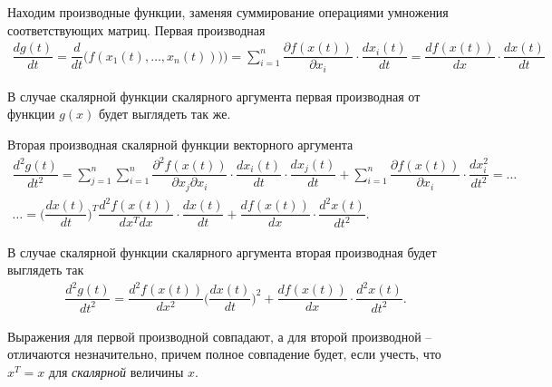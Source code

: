 \documentclass[%
	11pt,
	a4paper,
	utf8,
		]{article}
\begin{document}
Находим производные функции, заменяя суммирование операциями умножения соответствующих матриц. Первая производная
\begin{align*}
	\dfrac{ d g(t) }{ dt } = \dfrac{d}{dt} \Big( f(x_1(t), \ldots, x_n(t))) \Big) = \sum_{i=1}^{n} \dfrac{\partial f(x(t))}{\partial x_i} \cdot \dfrac{ d x_i(t) }{dt} = \dfrac{df(x(t))}{dx} \cdot \dfrac{dx(t)}{dt}
\end{align*}

В случае скалярной функции скалярного аргумента первая производная от функции $ g(x) $ будет выглядеть так же.

Вторая производная скалярной функции векторного аргумента
\begin{multline*}
  \dfrac{d^2 g(t)}{dt^2} = \sum_{j=1}^{n} \sum_{i=1}^{n} \dfrac{ \partial^2 f(x(t)) }{ \partial x_j \partial x_i } \cdot \dfrac{ d x_i(t) }{ dt } \cdot \dfrac{ d x_j(t) }{dt} + \sum_{i=1}^n \dfrac{ \partial f(x(t)) }{\partial x_i} \cdot \dfrac{d x_i^2}{d t^2} = \ldots \\
  \ldots = \Big( \dfrac{d x(t)}{dt} \Big)^T \dfrac{ d^2 f(x(t)) }{ dx^T dx } \cdot \dfrac{dx(t)}{dt} + \dfrac{df(x(t))}{dx} \cdot \dfrac{d^2 x(t)}{dt^2}.
\end{multline*}

В случае скалярной функции скалярного аргумента вторая производная будет выглядеть так
\begin{align*}
  \dfrac{d^2 g(t)}{d t^2} = \dfrac{ d^2 f(x(t)) }{dx^2} \Big( \dfrac{dx(t)}{dt} \Big)^2 + \dfrac{ df(x(t)) }{dx} \cdot \dfrac{ d^2 x(t) }{dt^2}.
\end{align*}

Выражения для первой производной совпадают, а для второй производной -- отличаются незначительно, причем полное совпадение будет, если учесть, что $ x^T = x $ для \emph{скалярной} величины $ x $.



\begin{thebibliography}{99}
	
	
	
\end{thebibliography}
\end{document}
